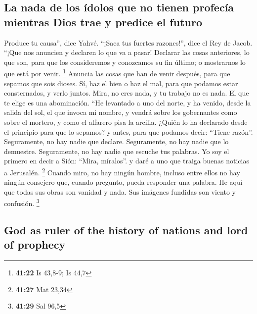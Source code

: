 \begin{paracol}{2}
\hypertarget{la-nada-de-los-uxeddolos-que-no-tienen-profecuxeda-mientras-dios-trae-y-predice-el-futuro}{%
\subsection{La nada de los ídolos que no tienen profecía mientras Dios
trae y predice el
futuro}\label{la-nada-de-los-uxeddolos-que-no-tienen-profecuxeda-mientras-dios-trae-y-predice-el-futuro}}

 Produce tu causa'', dice Yahvé. ``¡Saca tus fuertes
razones!'', dice el Rey de Jacob.  ``¡Que nos anuncien y
declaren lo que va a pasar! Declarar las cosas anteriores, lo que son,
para que los consideremos y conozcamos su fin último; o mostrarnos lo
que está por venir. \footnote{\textbf{41:22} Is 43,8-9; Is 44,7}
 Anuncia las cosas que han de venir después, para que
sepamos que sois dioses. Sí, haz el bien o haz el mal, para que podamos
estar consternados, y verlo juntos.  Mira, no eres nada,
y tu trabajo no es nada. El que te elige es una abominación.
 ``He levantado a uno del norte, y ha venido, desde la
salida del sol, el que invoca mi nombre, y vendrá sobre los gobernantes
como sobre el mortero, y como el alfarero pisa la arcilla.
 ¿Quién lo ha declarado desde el principio para que lo
sepamos? y antes, para que podamos decir: ``Tiene razón''. Seguramente,
no hay nadie que declare. Seguramente, no hay nadie que lo demuestre.
Seguramente, no hay nadie que escuche tus palabras.  Yo
soy el primero en decir a Sión: ``Mira, míralos''. y daré a uno que
traiga buenas noticias a Jerusalén. \footnote{\textbf{41:27} Mat 23,34}
 Cuando miro, no hay ningún hombre, incluso entre ellos
no hay ningún consejero que, cuando pregunto, pueda responder una
palabra.  He aquí que todas sus obras son vanidad y nada.
Sus imágenes fundidas son viento y confusión. \footnote{\textbf{41:29}
  Sal 96,5}

\switchcolumn
\begin{otherlanguage}{english}

\hypertarget{god-as-ruler-of-the-history-of-nations-and-lord-of-prophecy}{%
\subsection{God as ruler of the history of nations and lord of
prophecy}\label{god-as-ruler-of-the-history-of-nations-and-lord-of-prophecy}}


\end{otherlanguage}
\end{paracol}
